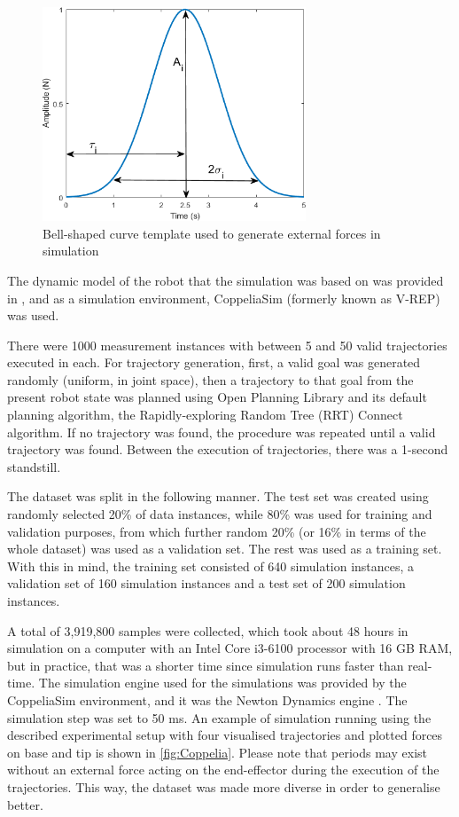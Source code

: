 \begin{figure}
    \centering
    \includegraphics[width=0.7\textwidth]{slike/Fig03_23.png}
    \caption{Bell-shaped curve template used to generate external forces in simulation}
    \label{fig:Bell}
\end{figure}

The dynamic model of the robot that the simulation was based on was provided in \cite{Gaz2019}, and as a simulation environment, CoppeliaSim (formerly known as V-REP) \cite{Rohmer2013} was used.

There were 1000 measurement instances with between 5 and 50 valid trajectories executed in each. For trajectory generation, first, a valid goal was generated randomly (uniform, in joint space), then a trajectory to that goal from the present robot state was planned using Open Planning Library \cite{Sucan2012} and its default planning algorithm, the Rapidly-exploring Random Tree (RRT) Connect algorithm. If no trajectory was found, the procedure was repeated until a valid trajectory was found. Between the execution of trajectories, there was a 1-second standstill. 

The dataset was split in the following manner. The test set was created using randomly selected 20\% of data instances, while 80\% was used for training and validation purposes, from which further random 20\% (or 16\% in terms of the whole dataset) was used as a validation set. The rest was used as a training set. With this in mind, the training set consisted of 640 simulation instances, a validation set of 160 simulation instances and a test set of 200 simulation instances.

A total of 3,919,800 samples were collected, which took about 48 hours in simulation on a computer with an Intel Core i3-6100 processor with 16 GB RAM, but in practice, that was a shorter time since simulation runs faster than real-time. The simulation engine used for the simulations was provided by the CoppeliaSim environment, and it was the Newton Dynamics engine \cite{Massera2007}. The simulation step was set to 50 ms. An example of simulation running using the described experimental setup with four visualised trajectories and plotted forces on base and tip is shown in \cref{fig:Coppelia}. Please note that periods may exist without an external force acting on the end-effector during the execution of the trajectories. This way, the dataset was made more diverse in order to generalise better. 

